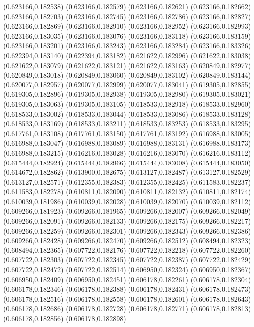 (0.623166,0.182538)
(0.623166,0.182579)
(0.623166,0.182621)
(0.623166,0.182662)
(0.623166,0.182703)
(0.623166,0.182745)
(0.623166,0.182786)
(0.623166,0.182827)
(0.623166,0.182869)
(0.623166,0.182910)
(0.623166,0.182952)
(0.623166,0.182993)
(0.623166,0.183035)
(0.623166,0.183076)
(0.623166,0.183118)
(0.623166,0.183159)
(0.623166,0.183201)
(0.623166,0.183243)
(0.623166,0.183284)
(0.623166,0.183326)
(0.622394,0.183140)
(0.622394,0.183182)
(0.621622,0.182996)
(0.621622,0.183038)
(0.621622,0.183079)
(0.621622,0.183121)
(0.621622,0.183163)
(0.620849,0.182977)
(0.620849,0.183018)
(0.620849,0.183060)
(0.620849,0.183102)
(0.620849,0.183144)
(0.620077,0.182957)
(0.620077,0.182999)
(0.620077,0.183041)
(0.619305,0.182855)
(0.619305,0.182896)
(0.619305,0.182938)
(0.619305,0.182980)
(0.619305,0.183021)
(0.619305,0.183063)
(0.619305,0.183105)
(0.618533,0.182918)
(0.618533,0.182960)
(0.618533,0.183002)
(0.618533,0.183044)
(0.618533,0.183086)
(0.618533,0.183128)
(0.618533,0.183169)
(0.618533,0.183211)
(0.618533,0.183253)
(0.618533,0.183295)
(0.617761,0.183108)
(0.617761,0.183150)
(0.617761,0.183192)
(0.616988,0.183005)
(0.616988,0.183047)
(0.616988,0.183089)
(0.616988,0.183131)
(0.616988,0.183173)
(0.616988,0.183215)
(0.616216,0.183028)
(0.616216,0.183070)
(0.616216,0.183112)
(0.615444,0.182924)
(0.615444,0.182966)
(0.615444,0.183008)
(0.615444,0.183050)
(0.614672,0.182862)
(0.613900,0.182675)
(0.613127,0.182487)
(0.613127,0.182529)
(0.613127,0.182571)
(0.612355,0.182383)
(0.612355,0.182425)
(0.611583,0.182237)
(0.611583,0.182278)
(0.610811,0.182090)
(0.610811,0.182132)
(0.610811,0.182174)
(0.610039,0.181986)
(0.610039,0.182028)
(0.610039,0.182070)
(0.610039,0.182112)
(0.609266,0.181923)
(0.609266,0.181965)
(0.609266,0.182007)
(0.609266,0.182049)
(0.609266,0.182091)
(0.609266,0.182133)
(0.609266,0.182175)
(0.609266,0.182217)
(0.609266,0.182259)
(0.609266,0.182301)
(0.609266,0.182343)
(0.609266,0.182386)
(0.609266,0.182428)
(0.609266,0.182470)
(0.609266,0.182512)
(0.608494,0.182323)
(0.608494,0.182365)
(0.607722,0.182176)
(0.607722,0.182218)
(0.607722,0.182260)
(0.607722,0.182303)
(0.607722,0.182345)
(0.607722,0.182387)
(0.607722,0.182429)
(0.607722,0.182472)
(0.607722,0.182514)
(0.606950,0.182324)
(0.606950,0.182367)
(0.606950,0.182409)
(0.606950,0.182451)
(0.606178,0.182261)
(0.606178,0.182304)
(0.606178,0.182346)
(0.606178,0.182388)
(0.606178,0.182431)
(0.606178,0.182473)
(0.606178,0.182516)
(0.606178,0.182558)
(0.606178,0.182601)
(0.606178,0.182643)
(0.606178,0.182686)
(0.606178,0.182728)
(0.606178,0.182771)
(0.606178,0.182813)
(0.606178,0.182856)
(0.606178,0.182898)
